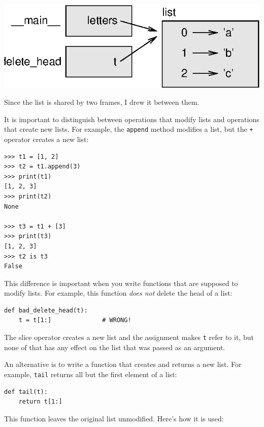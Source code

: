 \documentclass[10pt]{book}
\begin{document}

\beforefig
\centerline{\includegraphics{figs/stack5.eps}}
\afterfig

Since the list is shared by two frames, I drew
it between them.

It is important to distinguish between operations that
modify lists and operations that create new lists.  For
example, the {\tt append} method modifies a list, but the
{\tt +} operator creates a new list:


\beforeverb
\begin{verbatim}
>>> t1 = [1, 2]
>>> t2 = t1.append(3)
>>> print(t1)
[1, 2, 3]
>>> print(t2)
None

>>> t3 = t1 + [3]
>>> print(t3)
[1, 2, 3]
>>> t2 is t3
False
\end{verbatim}
\afterverb

This difference is important when you write functions that
are supposed to modify lists.  For example, this function
{\em does not} delete the head of a list:

\beforeverb
\begin{verbatim}
def bad_delete_head(t):
    t = t[1:]              # WRONG!
\end{verbatim}
\afterverb

The slice operator creates a new list and the assignment
makes {\tt t} refer to it, but none of that has any effect
on the list that was passed as an argument.


An alternative is to write a function that creates and
returns a new list.  For
example, {\tt tail} returns all but the first
element of a list:

\beforeverb
\begin{verbatim}
def tail(t):
    return t[1:]
\end{verbatim}
\afterverb
%
This function leaves the original list unmodified.
Here's how it is used:
\end{document}
